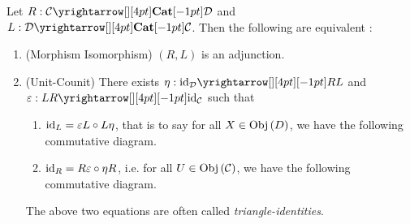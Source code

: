 \begin{prop}
  
  Let $R : \map{\CC}{\DD}{\CAT}{}$ and $L : \map{\DD}{\CC}{\CAT}{}$.
  Then the following are equivalent : 
  \begin{enumerate}
    \item (Morphism Isomorphism) $(R,L)$ is an adjunction. 
    \item (Unit-Counit) 
    There exists $\eta : \map{\id{\DD}}{RL}{}{}$ and 
    $\ep : \map{LR}{\id{\CC}}{}{}$ such that 
    \begin{enumerate}
      \item $\mathrm{id}_{L} = \varepsilon L \circ L \eta$,
      that is to say for all $X \in \mathrm{Obj}\left(D\right)$, 
      we have the following commutative diagram. 
      \begin{figure}[H]
        \centering
      \end{figure}
      \item $\mathrm{id}_{R} = R\varepsilon \circ \eta R$, i.e. 
      for all $U \in \mathrm{Obj}\left(\mathcal{C}\right)$, 
      we have the following commutative diagram. 
      \begin{figure}[H]
        \centering
      \end{figure}
    \end{enumerate}
    The above two equations are often called \emph{triangle-identities}.
  \end{enumerate}
\end{prop}
